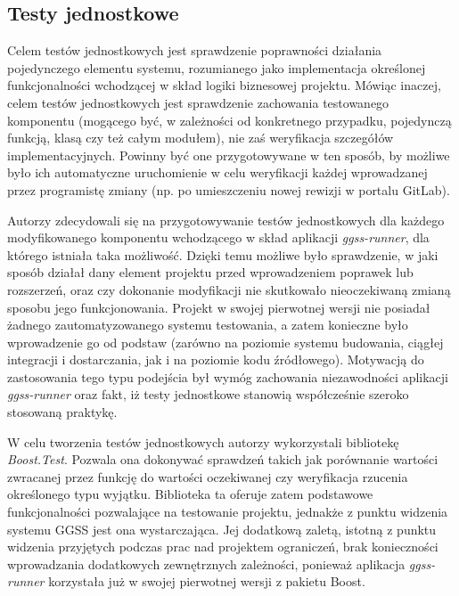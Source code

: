 \subsection{Testy jednostkowe}
Celem testów jednostkowych jest sprawdzenie poprawności działania pojedynczego elementu systemu, rozumianego jako implementacja określonej funkcjonalności wchodzącej w skład logiki biznesowej projektu. Mówiąc inaczej, celem testów jednostkowych jest sprawdzenie zachowania testowanego komponentu (mogącego być, w zależności od konkretnego przypadku, pojedynczą funkcją, klasą czy też całym modułem), nie zaś weryfikacja szczegółów implementacyjnych. Powinny być one przygotowywane w ten sposób, by możliwe było ich automatyczne uruchomienie w celu weryfikacji każdej wprowadzanej przez programistę zmiany (np. po umieszczeniu nowej rewizji w portalu GitLab). 

Autorzy zdecydowali się na przygotowywanie testów jednostkowych dla każdego modyfikowanego komponentu wchodzącego w skład aplikacji \emph{ggss-runner}, dla którego istniała taka możliwość. Dzięki temu możliwe było sprawdzenie, w jaki sposób działał dany element projektu przed wprowadzeniem poprawek lub rozszerzeń, oraz czy dokonanie modyfikacji nie skutkowało nieoczekiwaną zmianą sposobu jego funkcjonowania. Projekt w swojej pierwotnej wersji nie posiadał żadnego zautomatyzowanego systemu testowania, a zatem konieczne było wprowadzenie go od podstaw (zarówno na poziomie systemu budowania, ciągłej integracji i dostarczania, jak i na poziomie kodu źródłowego). Motywacją do zastosowania tego typu podejścia był wymóg zachowania niezawodności aplikacji \emph{ggss-runner} oraz fakt, iż testy jednostkowe stanowią współcześnie szeroko stosowaną praktykę. 

W celu tworzenia testów jednostkowych autorzy wykorzystali bibliotekę \emph{Boost.Test}. Pozwala ona dokonywać sprawdzeń takich jak porównanie wartości zwracanej przez funkcję do wartości oczekiwanej czy weryfikacja rzucenia określonego typu wyjątku. Biblioteka ta oferuje zatem podstawowe funkcjonalności pozwalające na testowanie projektu, jednakże z punktu widzenia systemu GGSS jest ona wystarczająca. Jej dodatkową zaletą, istotną z punktu widzenia przyjętych podczas prac nad projektem ograniczeń, brak konieczności wprowadzania dodatkowych zewnętrznych zależności, ponieważ aplikacja \emph{ggss-runner} korzystała już w swojej pierwotnej wersji z pakietu Boost.

